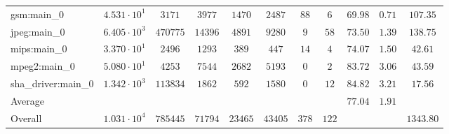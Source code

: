 \begin{tabular}{|l|c|c|c|c|c|c|c|c|c|c|}
gsm:main\_0             & $ 4.531 \cdot 10^{1} $ & $ 3171   $ & $ 3977  $ & $ 1470  $ & $ 2487  $ & $ 88  $ & $ 6   $ & $ 69.98       $ & $ 0.71    $ & $ 107.35  $ \\
jpeg:main\_0            & $ 6.405 \cdot 10^{3} $ & $ 470775 $ & $ 14396 $ & $ 4891  $ & $ 9280  $ & $ 9   $ & $ 58  $ & $ 73.50       $ & $ 1.39    $ & $ 138.75  $ \\
mips:main\_0            & $ 3.370 \cdot 10^{1} $ & $ 2496   $ & $ 1293  $ & $ 389   $ & $ 447   $ & $ 14  $ & $ 4   $ & $ 74.07       $ & $ 1.50    $ & $ 42.61   $ \\
mpeg2:main\_0           & $ 5.080 \cdot 10^{1} $ & $ 4253   $ & $ 7544  $ & $ 2682  $ & $ 5193  $ & $ 0   $ & $ 2   $ & $ 83.72       $ & $ 3.06    $ & $ 43.59   $ \\
sha\_driver:main\_0     & $ 1.342 \cdot 10^{3} $ & $ 113834 $ & $ 1862  $ & $ 592   $ & $ 1580  $ & $ 0   $ & $ 12  $ & $ 84.82       $ & $ 3.21    $ & $ 17.56   $ \\
\hline
Average                 & $                    $ & $        $ & $       $ & $       $ & $       $ & $     $ & $     $ & $ 77.04       $ & $ 1.91    $ & $         $ \\
\hline
Overall                 & $ 1.031 \cdot 10^{4} $ & $ 785445 $ & $ 71794 $ & $ 23465 $ & $ 43405 $ & $ 378 $ & $ 122 $ & $             $ & $         $ & $ 1343.80 $ \\
\hline
\end{tabular}

